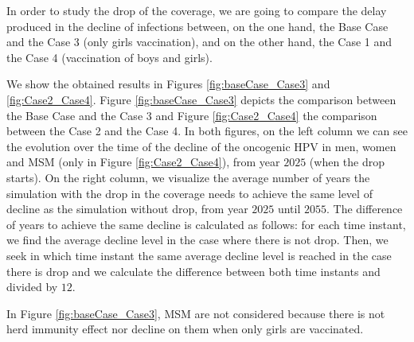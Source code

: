 In order to study the drop of the coverage, we are going to compare the delay produced in the decline of infections between, on the one hand, the Base Case and the Case 3 (only girls vaccination), and on the other hand, the Case 1 and the Case 4 (vaccination of boys and girls). 

We show the obtained results in Figures \ref{fig:baseCase_Case3} and \ref{fig:Case2_Case4}. Figure \ref{fig:baseCase_Case3} depicts the comparison between the Base Case and the Case 3 and Figure \ref{fig:Case2_Case4} the comparison between the Case 2 and the Case 4. In both figures, on the left column we can see the evolution over the time of the decline of the oncogenic HPV in men, women and MSM (only in Figure \ref{fig:Case2_Case4}), from year $2025$ (when the drop starts). On the right column, we visualize the average number of years the simulation with the drop in the coverage needs to achieve the same level of decline as the simulation without drop, from year $2025$ until $2055$. The difference of years to achieve the same decline is calculated as follows: for each time instant, we find the average decline level in the case where there is not drop. Then, we seek in which time instant the same average decline level is reached in the case there is drop and we calculate the difference between both time instants and divided by $12$.

In Figure \ref{fig:baseCase_Case3}, MSM are not considered because there is not herd immunity effect nor decline on them when only girls are vaccinated.  

